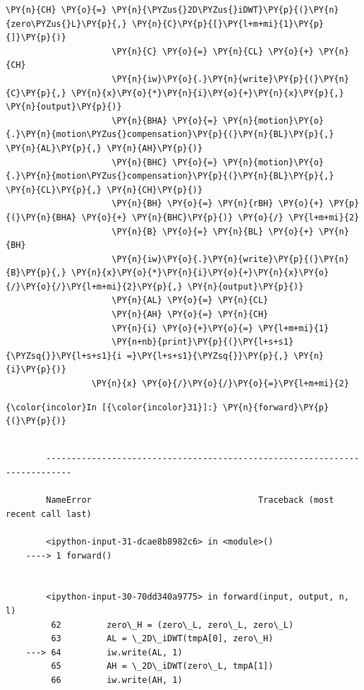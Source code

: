 {\begin{Verbatim}[commandchars=\\\{\}]
                     \PY{n}{CH} \PY{o}{=} \PY{n}{\PYZus{}2D\PYZus{}iDWT}\PY{p}{(}\PY{n}{zero\PYZus{}L}\PY{p}{,} \PY{n}{C}\PY{p}{[}\PY{l+m+mi}{1}\PY{p}{]}\PY{p}{)}
                     \PY{n}{C} \PY{o}{=} \PY{n}{CL} \PY{o}{+} \PY{n}{CH}
                     \PY{n}{iw}\PY{o}{.}\PY{n}{write}\PY{p}{(}\PY{n}{C}\PY{p}{,} \PY{n}{x}\PY{o}{*}\PY{n}{i}\PY{o}{+}\PY{n}{x}\PY{p}{,} \PY{n}{output}\PY{p}{)}
                     \PY{n}{BHA} \PY{o}{=} \PY{n}{motion}\PY{o}{.}\PY{n}{motion\PYZus{}compensation}\PY{p}{(}\PY{n}{BL}\PY{p}{,} \PY{n}{AL}\PY{p}{,} \PY{n}{AH}\PY{p}{)}
                     \PY{n}{BHC} \PY{o}{=} \PY{n}{motion}\PY{o}{.}\PY{n}{motion\PYZus{}compensation}\PY{p}{(}\PY{n}{BL}\PY{p}{,} \PY{n}{CL}\PY{p}{,} \PY{n}{CH}\PY{p}{)}
                     \PY{n}{BH} \PY{o}{=} \PY{n}{rBH} \PY{o}{+} \PY{p}{(}\PY{n}{BHA} \PY{o}{+} \PY{n}{BHC}\PY{p}{)} \PY{o}{/} \PY{l+m+mi}{2}
                     \PY{n}{B} \PY{o}{=} \PY{n}{BL} \PY{o}{+} \PY{n}{BH}
                     \PY{n}{iw}\PY{o}{.}\PY{n}{write}\PY{p}{(}\PY{n}{B}\PY{p}{,} \PY{n}{x}\PY{o}{*}\PY{n}{i}\PY{o}{+}\PY{n}{x}\PY{o}{/}\PY{o}{/}\PY{l+m+mi}{2}\PY{p}{,} \PY{n}{output}\PY{p}{)}
                     \PY{n}{AL} \PY{o}{=} \PY{n}{CL}
                     \PY{n}{AH} \PY{o}{=} \PY{n}{CH}
                     \PY{n}{i} \PY{o}{+}\PY{o}{=} \PY{l+m+mi}{1}
                     \PY{n+nb}{print}\PY{p}{(}\PY{l+s+s1}{\PYZsq{}}\PY{l+s+s1}{i =}\PY{l+s+s1}{\PYZsq{}}\PY{p}{,} \PY{n}{i}\PY{p}{)}
                 \PY{n}{x} \PY{o}{/}\PY{o}{/}\PY{o}{=}\PY{l+m+mi}{2}
\end{Verbatim}


    \begin{Verbatim}[commandchars=\\\{\}]
{\color{incolor}In [{\color{incolor}31}]:} \PY{n}{forward}\PY{p}{(}\PY{p}{)}
\end{Verbatim}


    \begin{Verbatim}[commandchars=\\\{\}]

        ---------------------------------------------------------------------------

        NameError                                 Traceback (most recent call last)

        <ipython-input-31-dcae8b8982c6> in <module>()
    ----> 1 forward()
    

        <ipython-input-30-70dd340a9775> in forward(input, output, n, l)
         62         zero\_H = (zero\_L, zero\_L, zero\_L)
         63         AL = \_2D\_iDWT(tmpA[0], zero\_H)
    ---> 64         iw.write(AL, 1)
         65         AH = \_2D\_iDWT(zero\_L, tmpA[1])
         66         iw.write(AH, 1)



\end{Verbatim}}
